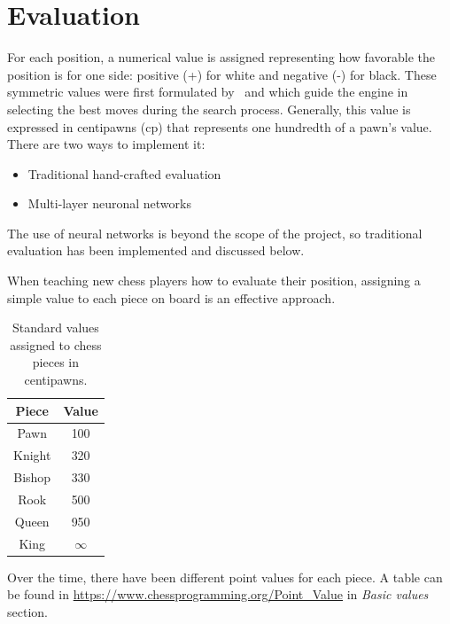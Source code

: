 \section{Evaluation}

For each position, a numerical value is assigned representing how favorable the position is for one side: positive (+) for white and negative (-) for black. These symmetric values were first formulated by~\cite{Shannon1950} and which guide the engine in selecting the best moves during the search process. Generally, this value is expressed in centipawns (cp) that represents one hundredth of a pawn's value. There are two ways to implement it:

\begin{itemize}
    \item Traditional hand-crafted evaluation
    \item Multi-layer neuronal networks
\end{itemize}

\noindent The use of neural networks is beyond the scope of the project, so traditional evaluation has been implemented and discussed below.

\vspace{1em}

\noindent When teaching new chess players how to evaluate their position, assigning a simple value to each piece on board is an effective approach.

\begin{table}[H]
    \centering
    \begin{tabular}{|c|c|}
        \hline
        Piece & Value \\ \hline
        Pawn & 100 \\ \hline
        Knight & 320 \\ \hline
        Bishop & 330 \\ \hline
        Rook & 500 \\ \hline
        Queen & 950 \\ \hline
        King & $\infty$ \\ \hline
    \end{tabular}
    \caption{Standard values assigned to chess pieces in centipawns.}
    \label{tab:piece-values}
\end{table}

\noindent Over the time, there have been different point values for each piece. A table can be found in \url{https://www.chessprogramming.org/Point_Value} in \textit{Basic values} section.

